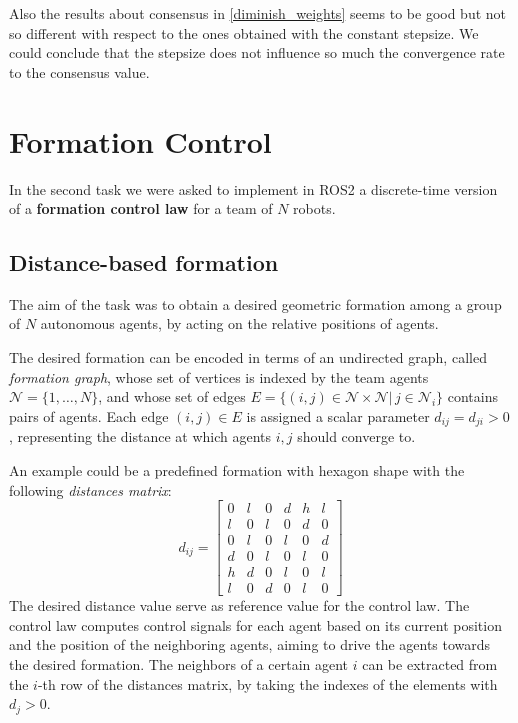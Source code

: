 \documentclass[a4paper,11pt,oneside]{book}
\begin{document}
Also the results about consensus in \ref{diminish_weights} seems to be good but not so different with respect to the ones obtained with the constant stepsize. We could conclude that the stepsize does not influence so much the convergence rate to the consensus value.


\chapter{Formation Control} 
 In the second task we were asked to implement in ROS2 a discrete-time version of a \textbf{formation control law} for a team of $N$ robots.

\section{Distance-based formation}
The aim of the task was to obtain a desired geometric formation among a group of $N$ autonomous agents, by acting on the relative positions of agents.

\bigskip
The desired formation can be encoded in terms of an undirected graph, called \textit{formation graph}, whose set of vertices is indexed by the team agents $\mathcal{N} =\{ 1, \ldots, N\}$, and whose set of edges $E=\{(i,j) \in \mathcal{N} \times \mathcal{N} | \, j \in \mathcal{N}_i\}$ contains pairs of agents. Each edge $(i,j) \in E$ is assigned a scalar parameter $d_{ij} = d_{ji} > 0$, representing the distance at which agents $i,j$ should converge to. 

An example could be a predefined formation with hexagon shape with the following \textit{distances matrix}:
\begin{equation}
d_{ij} =
\begin{bmatrix}
0 & l & 0 & d & h & l \\
l & 0 & l & 0 & d & 0 \\
0 & l & 0 & l & 0 & d \\
d & 0 & l & 0 & l & 0 \\
h & d & 0 & l & 0 & l \\
l & 0 & d & 0 & l & 0
\end{bmatrix}
\end{equation}
The desired distance value serve as reference value for the control law. The control law computes control signals for each agent based on its current position and the position of the neighboring agents, aiming to drive the agents towards the desired formation.
The neighbors of a certain agent $i$ can be extracted from the $i$-th row of the distances matrix, by taking the indexes of the elements with $d_j > 0$.
\end{document}
